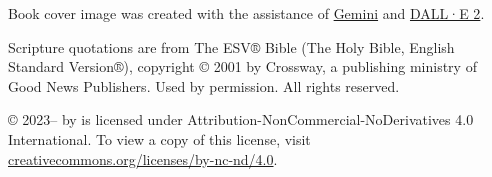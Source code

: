 \documentclass[twoside,a5paper,10pt,openright]{memoir}
\begin{document}
\vspace{0.5cm}
{
\footnotesize\noindent
Book cover image was created with the assistance of
\href{https://gemini.google.com}{Gemini} and \href{https://openai.com/dall-e-2}{DALL·E 2}.
}

\vspace{0.5cm}
{
\footnotesize\noindent
Scripture quotations are from The ESV® Bible (The Holy Bible, English Standard Version®),
copyright © 2001 by Crossway, a publishing ministry of Good News Publishers. Used by
permission. All rights reserved.
}

\vspace{0.5cm}
{
\footnotesize\noindent
\thetitle{} © 2023--\the\year{} by \theauthor{} is licensed under
Attribution-NonCommercial-NoDerivatives 4.0 International. To view a copy of this license,
visit
\href{http://creativecommons.org/licenses/by-nc-nd/4.0/}{creativecommons.org/licenses/by-nc-nd/4.0}.
}

\thispagestyle{empty}
\newpage

\tableofcontents*
\thispagestyle{empty}




\mainmatter










\printbibliography
\end{document}
